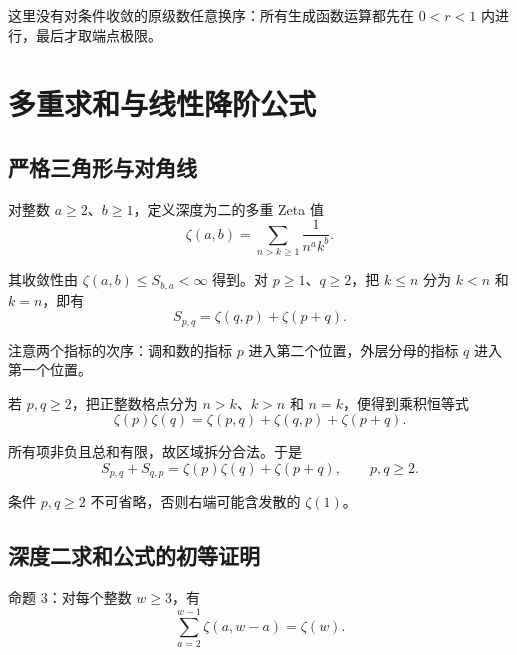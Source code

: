 \documentclass[11pt,a4paper]{article}
\newenvironment{statementblock}{\par\Needspace{9\baselineskip}\noindent}{\par\nopagebreak[4]}
\begin{document}
这里没有对条件收敛的原级数任意换序：所有生成函数运算都先在 \(0<r<1\) 内进行，最后才取端点极限。

\hypertarget{sec-7}{%
\section{多重求和与线性降阶公式}\label{sec-7}}

\hypertarget{sec-7-1}{%
\subsection{严格三角形与对角线}\label{sec-7-1}}

对整数 \(a\geqslant2\)、\(b\geqslant1\)，定义深度为二的多重 Zeta 值
\[
\zeta(a,b)=\sum_{n>k\geqslant1}\frac1{n^ak^b}.
\]

其收敛性由 \(\zeta(a,b)\leqslant S_{b,a}<\infty\) 得到。对 \(p\geqslant1\)、\(q\geqslant2\)，把 \(k\leqslant n\) 分为 \(k<n\) 和 \(k=n\)，即有
\[
S_{p,q}=\zeta(q,p)+\zeta(p+q).
\]

注意两个指标的次序：调和数的指标 \(p\) 进入第二个位置，外层分母的指标 \(q\) 进入第一个位置。

若 \(p,q\geqslant2\)，把正整数格点分为 \(n>k\)、\(k>n\) 和 \(n=k\)，便得到乘积恒等式
\[
\zeta(p)\zeta(q)
=\zeta(p,q)+\zeta(q,p)+\zeta(p+q).
\]

所有项非负且总和有限，故区域拆分合法。于是
\[
S_{p,q}+S_{q,p}
=\zeta(p)\zeta(q)+\zeta(p+q),
\qquad p,q\geqslant2.
\]

条件 \(p,q\geqslant2\) 不可省略，否则右端可能含发散的 \(\zeta(1)\)。

\hypertarget{sec-7-2}{%
\subsection{深度二求和公式的初等证明}\label{sec-7-2}}

\begin{statementblock}

命题 3：对每个整数 \(w\geqslant3\)，有
\[
\sum_{a=2}^{w-1}\zeta(a,w-a)=\zeta(w).
\]

\end{statementblock}
\end{document}
